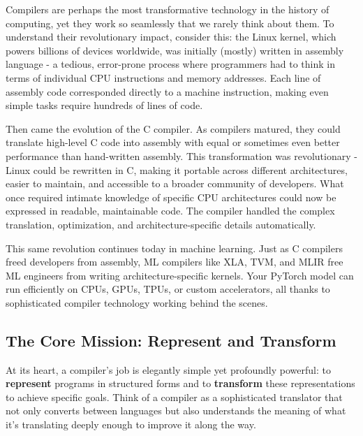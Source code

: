 \documentclass[11pt,a4paper]{article}
\begin{document}
Compilers are perhaps the most transformative technology in the history of computing, yet they work so seamlessly that we rarely think about them. To understand their revolutionary impact, consider this: the Linux kernel, which powers billions of devices worldwide, was initially (mostly) written in assembly language - a tedious, error-prone process where programmers had to think in terms of individual CPU instructions and memory addresses. Each line of assembly code corresponded directly to a machine instruction, making even simple tasks require hundreds of lines of code.

Then came the evolution of the C compiler. As compilers matured, they could translate high-level C code into assembly with equal or sometimes even better performance than hand-written assembly. This transformation was revolutionary - Linux could be rewritten in C, making it portable across different architectures, easier to maintain, and accessible to a broader community of developers. What once required intimate knowledge of specific CPU architectures could now be expressed in readable, maintainable code. The compiler handled the complex translation, optimization, and architecture-specific details automatically.

This same revolution continues today in machine learning. Just as C compilers freed developers from assembly, ML compilers like XLA, TVM, and MLIR free ML engineers from writing architecture-specific kernels. Your PyTorch model can run efficiently on CPUs, GPUs, TPUs, or custom accelerators, all thanks to sophisticated compiler technology working behind the scenes.

\subsection{The Core Mission: Represent and Transform}

At its heart, a compiler's job is elegantly simple yet profoundly powerful: to \textbf{represent} programs in structured forms and to \textbf{transform} these representations to achieve specific goals. Think of a compiler as a sophisticated translator that not only converts between languages but also understands the meaning of what it's translating deeply enough to improve it along the way.
\end{document}
